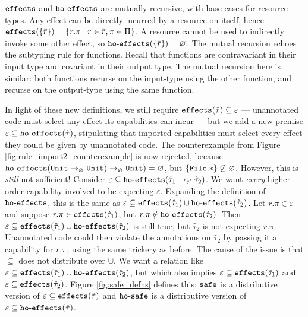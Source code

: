 $\mathtt{effects}$ and $\mathtt{ho \hbox{-} effects}$ are mutually recursive, with base cases for resource types. Any effect can be directly incurred by a resource on itself, hence $\mathtt{effects}(\{ \bar r \}) = \{ r.\pi \mid r \in \bar r, \pi \in \Pi \}$. A resource cannot be used to indirectly invoke some other effect, so $\mathtt{ho \hbox{-} effects}(\{ \bar r \}) = \varnothing$. The mutual recursion echoes the subtyping rule for functions. Recall that functions are contravariant in their input type and covariant in their output type. The mutual recursion here is similar: both functions recurse on the input-type using the other function, and recurse on the output-type using the same function.

In light of these new definitions, we still require $\mathtt{effects}(\hat \tau) \subseteq \varepsilon$ --- unannotated code must select any effect its capabilities can incur --- but we add a new premise $\varepsilon \subseteq \mathtt{ho \hbox{-} effects}(\hat \tau)$, stipulating that imported capabilities must select every effect they could be given by unannotated code. The counterexample from Figure \ref{fig:rule_import2_counterexample} is now rejected, because $\mathtt{ho \hbox{-} effects}(\mathtt{Unit} \rightarrow_{\varnothing} \mathtt{Unit}) \rightarrow_{\varnothing} \mathtt{Unit}) = \varnothing$, but $\{ \mathtt{File.*} \} \not\subseteq \varnothing$.  However, this is \textit{still} not sufficient! Consider $\varepsilon \subseteq \mathtt{ho \hbox{-} effects}( \hat \tau_1 \rightarrow_{\varepsilon'} \hat \tau_2 )$. We want \textit{every} higher-order capability involved to be expecting $\varepsilon$. Expanding the definition of $\mathtt{ho \hbox{-} effects}$, this is the same as $\varepsilon \subseteq \mathtt{effects}(\hat \tau_1) \cup \mathtt{ho \hbox{-} effects}(\hat \tau_2)$. Let $r.\pi \in \varepsilon$ and suppose $r.\pi \in \mathtt{effects}(\hat \tau_1)$, but $r.\pi \notin \mathtt{ho \hbox{-} effects}(\hat \tau_2)$. Then $\varepsilon \subseteq \mathtt{effects}(\hat \tau_1) \cup \mathtt{ho \hbox{-} effects}(\hat \tau_2)$ is still true, but $\hat \tau_2$ is not expecting $r.\pi$. Unannotated code could then violate the annotations on $\hat \tau_2$ by passing it a capability for $r.\pi$, using the same trickery as before. The cause of the issue is that $\subseteq$ does not distribute over $\cup$. We want a relation like $\varepsilon \subseteq \mathtt{effects}(\hat \tau_1) \cup \mathtt{ho \hbox{-} effects}(\hat \tau_2)$, but which also implies $\varepsilon \subseteq \mathtt{effects}(\hat \tau_1)$ and $\varepsilon \subseteq \mathtt{effects}(\hat \tau_2)$. Figure \ref{fig:safe_defns} defines this: $\mathtt{safe}$ is a distributive version of $\varepsilon \subseteq \mathtt{effects}(\hat \tau)$ and $\mathtt{ho \hbox{-} safe}$ is a distributive version of $\varepsilon \subseteq \mathtt{ho \hbox{-} effects}(\hat \tau)$.


